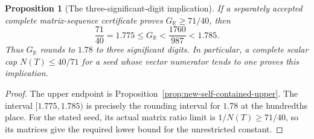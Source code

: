\documentclass[11pt]{article}
\newtheorem{proposition}[theorem]{Proposition}
\begin{document}
\begin{proposition}[The three-significant-digit implication]
\label{prop:new-three-significant-digit-implication}
If a separately accepted complete matrix-sequence certificate proves
$G_{\mathbb R}\geq71/40$, then
\[
 \frac{71}{40}=1.775\leq G_{\mathbb R}
                         <\frac{1760}{987}<1.785.
\]
Thus $G_{\mathbb R}$ rounds to $1.78$ to three significant digits.
In particular, a complete scalar cap $N(T)\leq40/71$ for a seed
whose vector numerator tends to one proves this implication.
\end{proposition}
\begin{proof}
The upper endpoint is Proposition~\ref{prop:new-self-contained-upper}.
The interval $[1.775,1.785)$ is precisely the rounding interval for
$1.78$ at the hundredths place.  For the stated seed, its actual
matrix ratio limit is $1/N(T)\geq71/40$, so its matrices give the
required lower bound for the unrestricted constant.
\end{proof}
\end{document}

